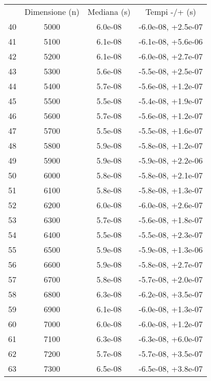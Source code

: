 \begin{table}
\centering
\begin{adjustbox}{width=1\textwidth/2}
\begin{tabular}{|c|c|c|c|}
\hline
 & Dimensione (n) & Mediana (s) & Tempi -/+ (s) \\
40 & 5000 & 6.0e-08 & -6.0e-08, +2.5e-07 \\
\cline{1-4}
41 & 5100 & 6.1e-08 & -6.1e-08, +5.6e-06 \\
\cline{1-4}
42 & 5200 & 6.1e-08 & -6.0e-08, +2.7e-07 \\
\cline{1-4}
43 & 5300 & 5.6e-08 & -5.5e-08, +2.5e-07 \\
\cline{1-4}
44 & 5400 & 5.7e-08 & -5.6e-08, +1.2e-07 \\
\cline{1-4}
45 & 5500 & 5.5e-08 & -5.4e-08, +1.9e-07 \\
\cline{1-4}
46 & 5600 & 5.7e-08 & -5.6e-08, +1.2e-07 \\
\cline{1-4}
47 & 5700 & 5.5e-08 & -5.5e-08, +1.6e-07 \\
\cline{1-4}
48 & 5800 & 5.9e-08 & -5.8e-08, +1.2e-07 \\
\cline{1-4}
49 & 5900 & 5.9e-08 & -5.9e-08, +2.2e-06 \\
\cline{1-4}
50 & 6000 & 5.8e-08 & -5.8e-08, +2.1e-07 \\
\cline{1-4}
51 & 6100 & 5.8e-08 & -5.8e-08, +1.3e-07 \\
\cline{1-4}
52 & 6200 & 6.0e-08 & -6.0e-08, +2.6e-07 \\
\cline{1-4}
53 & 6300 & 5.7e-08 & -5.6e-08, +1.8e-07 \\
\cline{1-4}
54 & 6400 & 5.5e-08 & -5.5e-08, +2.3e-07 \\
\cline{1-4}
55 & 6500 & 5.9e-08 & -5.9e-08, +1.3e-06 \\
\cline{1-4}
56 & 6600 & 5.9e-08 & -5.8e-08, +2.7e-07 \\
\cline{1-4}
57 & 6700 & 5.8e-08 & -5.7e-08, +2.0e-07 \\
\cline{1-4}
58 & 6800 & 6.3e-08 & -6.2e-08, +3.5e-07 \\
\cline{1-4}
59 & 6900 & 6.1e-08 & -6.0e-08, +1.3e-07 \\
\cline{1-4}
60 & 7000 & 6.0e-08 & -6.0e-08, +1.2e-07 \\
\cline{1-4}
61 & 7100 & 6.3e-08 & -6.3e-08, +6.0e-07 \\
\cline{1-4}
62 & 7200 & 5.7e-08 & -5.7e-08, +3.5e-07 \\
\cline{1-4}
63 & 7300 & 6.5e-08 & -6.5e-08, +3.8e-07 \\

\end{tabular}
\end{adjustbox}
\end{table}
